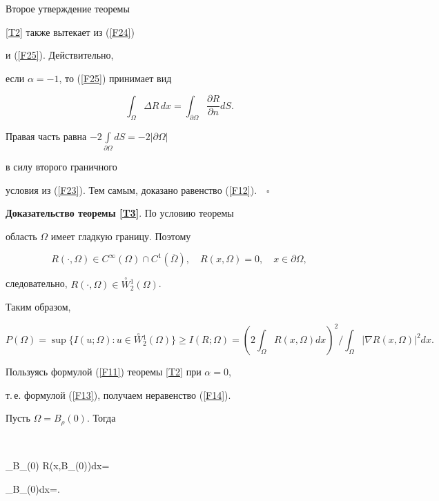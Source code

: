 Второе утверждение теоремы {\ref{T2} также вытекает из (\ref{F24}) 


и (\ref{F25}). Действительно,


если $\alpha=-1$, то (\ref{F25}) принимает вид


$$


\int_\Omega \Delta R\, dx=\int_{\partial\Omega}


\frac{\partial R}{\partial n} dS.


$$


Правая часть равна $-2\int\limits_{\partial\Omega}dS=-2|\partial\Omega|$ 


в силу второго граничного


условия из (\ref{F23}). Тем самым, доказано равенство (\ref{F12}).$\quad\square$


\medskip





{\bf Доказательство теоремы \ref{T3}}. По условию теоремы 


область $\Omega$ имеет гладкую границу. Поэтому


$$


R(\cdot,\Omega)\in C^\infty (\Omega)\cap C^1(\overline{\Omega}),


\quad R(x,\Omega)=0, \quad x\in\partial\Omega,


$$


следовательно, $R(\cdot,\Omega)\in \overset{\circ}{W}{}_2^1(\Omega)$. 


Таким образом,


$$


P(\Omega)=\sup \{ {I(u;\Omega) : u\in \overset{\circ}{W}{}_2^1(\Omega)}\}


\geq I(R;\Omega)=


\left( {2\int_\Omega R(x,\Omega)dx} \right)^2 \Big/ \int_\Omega


|\nabla R(x,\Omega)|^2dx .


$$


Пользуясь формулой (\ref{F11}) теоремы \ref{T2} при $\alpha =0$,


т.\,е. формулой (\ref{F13}), получаем неравенство (\ref{F14}).





Пусть $\Omega =B_\rho (0)$. Тогда


$$


\int_{B_\rho (0)} R(x,B_\rho (0))dx=


\int_{B_\rho (0)}dx=.


}

